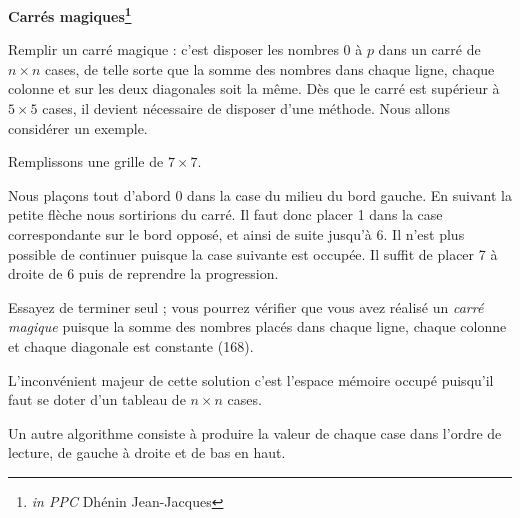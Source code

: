 \setcounter{section}{6}
\centerline{\Large \bf Carr\'es magiques\footnote{{\it in PPC }
Dh\'enin Jean-Jacques}}
\label{Kmag}

\noindent\hrulefill

\vspace{.5cm}


{Remplir} un carr\'e magique : c'est 
disposer les nombres 0 \`a $p$
dans un carr\'e de $n \times n$ cases, de telle sorte que la somme des nombres
dans chaque ligne, chaque colonne et sur les deux diagonales soit la m\^eme. D\`es
que le carr\'e est sup\'erieur \`a $5 \times 5$ cases, il devient n\'ecessaire de
disposer d'une m\'ethode. Nous allons consid\'erer un exemple.


Remplissons une grille de $7 \times 7$.

\begin{floatingfigure}[l]{45mm}

\end{floatingfigure}

Nous pla\c cons tout d'abord 0 dans la case du milieu du bord gauche. En suivant
la petite fl\`eche nous sortirions du carr\'e. Il faut donc placer 1 dans la case
correspondante sur le bord oppos\'e, et ainsi de suite jusqu'\`a 6. Il n'est plus
possible de continuer puisque la case suivante est occup\'ee. Il suffit de
placer 7 \`a droite de 6 puis de reprendre la progression.

Essayez de terminer seul ; vous pourrez v\'erifier que vous avez r\'ealis\'e
un {\it carr\'e magique} puisque la somme des nombres plac\'es dans chaque ligne,
chaque colonne et chaque diagonale est constante (168).


L'inconv\'enient majeur de cette solution c'est l'espace m\'emoire occup\'e
puisqu'il faut se doter d'un tableau de $n \times n$ cases.

Un autre
algorithme consiste \`a produire la valeur de chaque case dans l'ordre de
lecture, de gauche \`a droite et de bas en haut.

